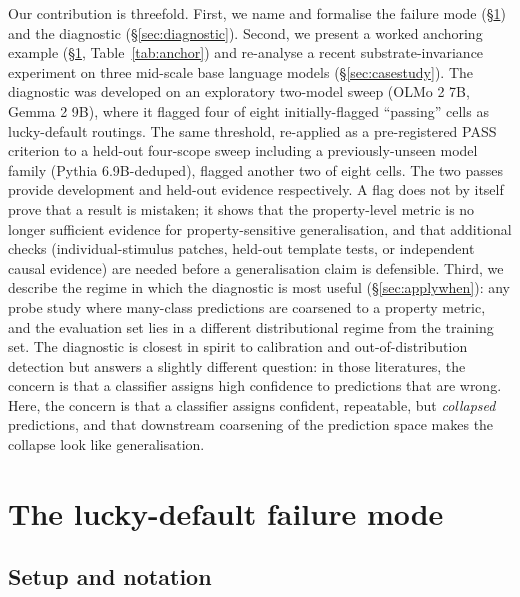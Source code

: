 \documentclass[11pt,letterpaper]{article}
\begin{document}
Our contribution is threefold. First, we name and formalise the
failure mode (\S\ref{sec:failure}) and the diagnostic
(\S\ref{sec:diagnostic}). Second, we present a worked anchoring
example (\S\ref{sec:failure}, Table~\ref{tab:anchor}) and re-analyse
a recent substrate-invariance experiment on three mid-scale base
language models (\S\ref{sec:casestudy}). The diagnostic was developed
on an exploratory two-model sweep (OLMo 2 7B, Gemma 2 9B), where it
flagged four of eight initially-flagged ``passing'' cells as
lucky-default routings. The same threshold, re-applied as a
pre-registered PASS criterion to a held-out four-scope sweep
including a previously-unseen model family (Pythia 6.9B-deduped),
flagged another two of eight cells. The two passes provide
development and held-out evidence respectively. A flag does not by
itself prove that a result is mistaken; it shows that the
property-level metric is no longer sufficient evidence for
property-sensitive generalisation, and that additional checks
(individual-stimulus patches, held-out template tests, or independent
causal evidence) are needed before a generalisation claim is
defensible. Third, we describe the regime in
which the diagnostic is most useful (\S\ref{sec:applywhen}): any
probe study where many-class predictions are coarsened to a property
metric, and the evaluation set lies in a different distributional
regime from the training set.
The diagnostic is closest in spirit to calibration
\citep{guo2017calibration} and out-of-distribution detection
\citep{hendrycks2017baseline,liang2018odin,lee2018mahalanobis} but
answers a slightly different question: in those literatures, the
concern is that a classifier assigns high confidence to predictions
that are wrong. Here, the concern is that a classifier assigns
confident, repeatable, but \emph{collapsed} predictions, and that
downstream coarsening of the prediction space makes the collapse look
like generalisation.

\section{The lucky-default failure mode}
\label{sec:failure}

\subsection{Setup and notation}
\end{document}
